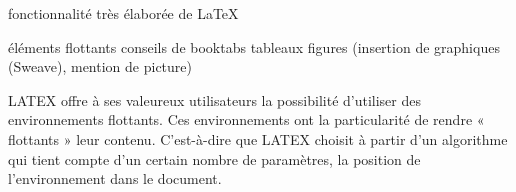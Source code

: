 fonctionnalité très élaborée de LaTeX


éléments flottants
conseils de booktabs
tableaux
figures (insertion de graphiques (Sweave), mention de picture)

LATEX offre à ses valeureux utilisateurs la possibilité d'utiliser des environnements flottants. Ces environnements ont la particularité de rendre « flottants » leur contenu. C'est-à-dire que LATEX choisit à partir d'un algorithme qui tient compte d'un certain nombre de paramètres, la position de l'environnement dans le document.

